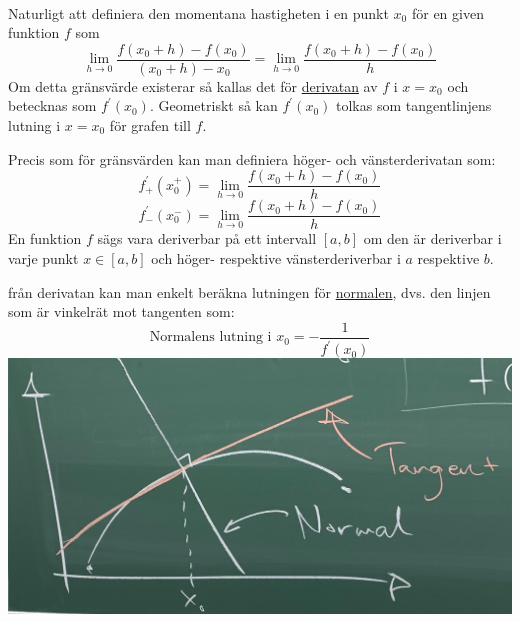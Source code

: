 \\
Naturligt  att definiera den momentana hastigheten i en punkt $x_0$ för en given funktion $f$ som
\begin{equation*}
    \lim_{h\to 0}\frac{f(x_0+h)-f(x_0)}{(x_0+h)-x_0}=\lim_{h\to 0}\frac{f(x_0+h)-f(x_0)}{h}
\end{equation*}
Om detta gränsvärde existerar så kallas det för \underline{derivatan} av $f$ i $x=x_0$ och betecknas som $f^\prime(x_0)$.
Geometriskt så kan $f^\prime(x_0)$ tolkas som tangentlinjens lutning i $x=x_0$ för grafen till $f$.

Precis som för gränsvärden kan man definiera höger- och vänsterderivatan som:
\begin{equation*}
    f_+^\prime(x_0^+)=\lim_{h\to 0}\frac{f(x_0+h)-f(x_0)}{h}
\end{equation*}
\begin{equation*}
    f_-^\prime(x_0^-)=\lim_{h\to 0}\frac{f(x_0+h)-f(x_0)}{h}
\end{equation*}
En funktion $f$ sägs vara deriverbar på ett intervall $[a,b]$ om den är deriverbar i varje punkt $x\in[a,b]$
och höger- respektive vänsterderiverbar i $a$ respektive $b$.

från derivatan kan man enkelt beräkna lutningen för \underline{normalen}, dvs. den linjen som är vinkelrät mot tangenten som:
\begin{equation*}
    \text{Normalens lutning i }x_0=-\frac{1}{f^\prime(x_0)}
\end{equation*}
\includegraphics[scale=0.2]{lessons/lesson06/imgs/img03.jpg}

